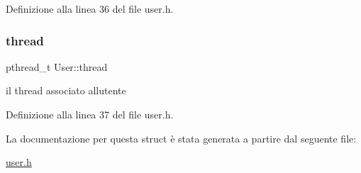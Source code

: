 Definizione alla linea 36 del file user.\+h.

\mbox{\label{structUser_aa75a447467f6811a2d8a2c967e1a6de8}} 
\subsubsection{\texorpdfstring{thread}{thread}}
{\footnotesize\ttfamily pthread\+\_\+t User\+::thread}



il thread associato all\textquotesingle{}utente 



Definizione alla linea 37 del file user.\+h.



La documentazione per questa struct è stata generata a partire dal seguente file\+:\begin{DoxyCompactItemize}
\item 
\hyperlink{user_8h}{user.\+h}\end{DoxyCompactItemize}
